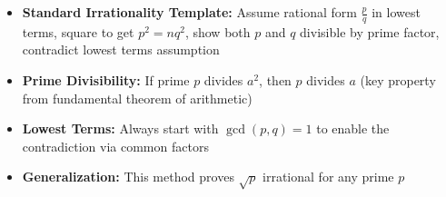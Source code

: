\begin{takeaways}
\begin{itemize}
\item \textbf{Standard Irrationality Template:} Assume rational form $\frac{p}{q}$ in lowest terms, square to get $p^2 = nq^2$, show both $p$ and $q$ divisible by prime factor, contradict lowest terms assumption
\item \textbf{Prime Divisibility:} If prime $p$ divides $a^2$, then $p$ divides $a$ (key property from fundamental theorem of arithmetic)
\item \textbf{Lowest Terms:} Always start with $\gcd(p,q) = 1$ to enable the contradiction via common factors
\item \textbf{Generalization:} This method proves $\sqrt{p}$ irrational for any prime $p$
\end{itemize}
\end{takeaways}
